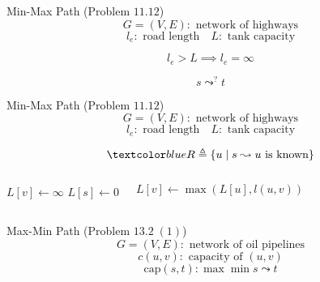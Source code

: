 \begin{frame}{}
  \begin{exampleblock}{Min-Max Path (Problem $11.12$)}
    \[
      G = (V, E): \text{ network of highways}
    \]
    \[
      l_e: \text{ road length} \quad L: \text{ tank capacity}
    \]

    \vspace{0.30cm}
    \centerline{}
  \end{exampleblock}

  \pause
  \[
    l_e > L \implies l_e = \infty
  \]

  \pause
  \[
    s \leadsto^{?} t
  \]
\end{frame}

\begin{frame}{}
  \begin{exampleblock}{Min-Max Path (Problem $11.12$)}
    \[
      G = (V, E): \text{ network of highways}
    \]
    \[
      l_e: \text{ road length} \quad L: \text{ tank capacity}
    \]
	  
    \vspace{0.30cm}
    \centerline{}
  \end{exampleblock}

  \pause
\end{frame}

\begin{frame}{}
  \[
    \blue{R \triangleq \set{u \mid s \leadsto u \text{ is known}}}
  \]

  \vspace{0.50cm}
  \begin{columns}
      \begin{algorithmic}
	  \State $L[v] \gets \infty$
	\EndFor
	\State $L[s] \gets 0$
      \end{algorithmic}
      \begin{algorithmic}
	  \State $L[v] \gets \max(L[u], l(u,v))$
	\EndIf
      \end{algorithmic}
  \end{columns}
\end{frame}

\begin{frame}{}
  \begin{exampleblock}{Max-Min Path (Problem $13.2\; (1)$)}
    \[
      G = (V, E): \text{ network of oil pipelines}
    \]
    \[
      c(u,v): \text{ capacity of } (u,v)
    \]
    \[
      \text{cap}(s,t): \max \min s \leadsto t
    \]
    
    \vspace{0.30cm}
    \centerline{}
  \end{exampleblock}

  \pause
\end{frame}

